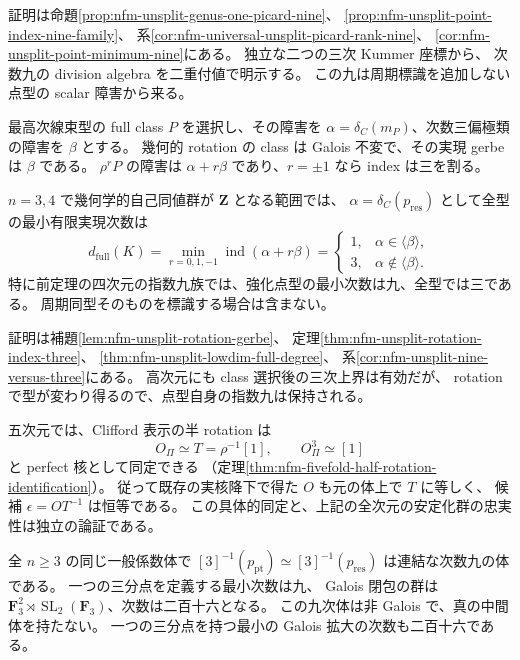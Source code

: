 証明は命題\ref{prop:nfm-unsplit-genus-one-picard-nine}、
\ref{prop:nfm-unsplit-point-index-nine-family}、
系\ref{cor:nfm-universal-unsplit-picard-rank-nine}、
\ref{cor:nfm-unsplit-point-minimum-nine}にある。
独立な二つの三次 Kummer 座標から、
次数九の division algebra を二重付値で明示する。
この九は周期標識を追加しない点型の scalar 障害から来る。

\begin{maintheorem}
\label{main:nfm-unsplit-full-minimum}
最高次線束型の full class $P$ を選択し、その障害を
$\alpha=\delta_C(m_P)$、次数三偏極類の障害を $\beta$ とする。
幾何的 rotation の class は Galois 不変で、その実現 gerbe は $\beta$ である。
$\rho^rP$ の障害は $\alpha+r\beta$ であり、$r=\pm1$ なら index は三を割る。

$n=3,4$ で幾何学的自己同値群が $\mathbf Z$ となる範囲では、
$\alpha=\delta_C(p_{\mathrm{res}})$ として全型の最小有限実現次数は
\[
 d_{\mathrm{full}}(K)=\min_{r=0,1,-1}\operatorname{ind}(\alpha+r\beta)
 =\begin{cases}1,&\alpha\in\langle\beta\rangle,\\
 3,&\alpha\notin\langle\beta\rangle.
 \end{cases}
\]
特に前定理の四次元の指数九族では、強化点型の最小次数は九、全型では三である。
周期同型そのものを標識する場合は含まない。
\end{maintheorem}

証明は補題\ref{lem:nfm-unsplit-rotation-gerbe}、
定理\ref{thm:nfm-unsplit-rotation-index-three}、
\ref{thm:nfm-unsplit-lowdim-full-degree}、
系\ref{cor:nfm-unsplit-nine-versus-three}にある。
高次元にも class 選択後の三次上界は有効だが、
rotation で型が変わり得るので、点型自身の指数九は保持される。

五次元では、Clifford 表示の半 rotation は
\[
 O_\Pi\simeq T=\rho^{-1}[1],\qquad O_\Pi^3\simeq[1]
\]
と perfect 核として同定できる
（定理\ref{thm:nfm-fivefold-half-rotation-identification}）。
従って既存の実核降下で得た $O$ も元の体上で $T$ に等しく、
候補 $\epsilon=OT^{-1}$ は恒等である。
この具体的同定と、上記の全次元の安定化群の忠実性は独立の論証である。

\begin{maintheorem}
\label{main:nfm-third-division-monodromy}
全 $n\ge3$ の同じ一般係数体で
$[3]^{-1}(p_{\mathrm{pt}})\simeq[3]^{-1}(p_{\mathrm{res}})$ は連結な次数九の体である。
一つの三分点を定義する最小次数は九、
Galois 閉包の群は $\mathbf F_3^2\rtimes\operatorname{SL}_2(\mathbf F_3)$、次数は二百十六となる。
この九次体は非 Galois で、真の中間体を持たない。
一つの三分点を持つ最小の Galois 拡大の次数も二百十六である。
\end{maintheorem}

